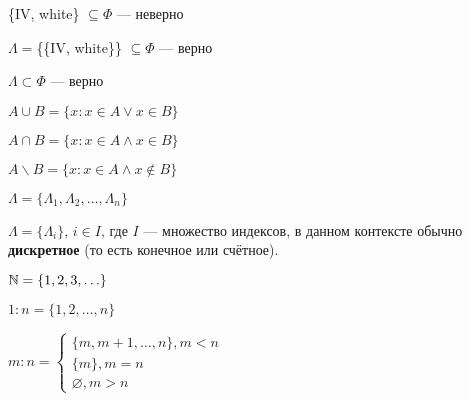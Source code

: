 \begin{remark}
    \begin{compactenum}
        \item \{IV, white\} $\subseteq \Phi$ --- неверно
        \item $\Lambda=$\{\{IV, white\}\} $\subseteq \Phi$ --- верно
        \item $\Lambda \subset \Phi$ --- верно
    \end{compactenum}
\end{remark}

\begin{definition}
    \begin{compactitem}
        \item {} $A \cup B = \{x: x \in A \lor x \in B\}$
        \item {} $A \cap B = \{x: x \in A \land x \in B\}$
        \item {} $A \backslash B = \{x: x\in A \land x \notin B\}$
    \end{compactitem}
\end{definition}

\begin{designation}
    \begin{compactitem}
        \item $\Lambda=\{\Lambda_1, \Lambda_2, \ldots, \Lambda_n\}$
        \item $\Lambda=\{\Lambda_i\}$, $i \in I$, где $I$ — множество индексов, в данном контексте обычно \textbf{дискретное} (то есть конечное или счётное).
    \end{compactitem}
\end{designation}

\begin{sh-definition}
    $\N = \{1, 2, 3, \ldots\}$
\end{sh-definition}

\begin{designation}
    \begin{compactitem}
        \item $1:n=\{1, 2, \ldots, n\}$
        \item $m:n=
        \begin{cases}
            \{m, m + 1, \ldots, n\}, m < n\\
            \{m\}, m = n\\
            \varnothing, m > n
        \end{cases}$
    \end{compactitem}
\end{designation}

